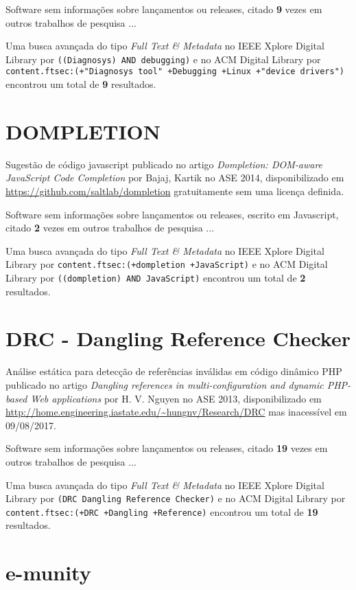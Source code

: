 Software sem informações sobre lançamentos ou releases,
citado {\bf 9} vezes em outros trabalhos de pesquisa ...

Uma busca avançada do tipo {\it Full Text \& Metadata} no IEEE Xplore Digital Library por
\texttt{((Diagnosys) AND debugging)}
e no ACM Digital Library por
\texttt{content.ftsec:(+"Diagnosys tool" +Debugging +Linux +"device drivers")}
encontrou um total de
{\bf 9}
resultados.

\section{DOMPLETION}

Sugestão de código javascript
publicado no artigo {\it Dompletion: DOM-aware JavaScript Code Completion}
por Bajaj, Kartik
no ASE 2014,
disponibilizado em \url{https://github.com/saltlab/dompletion}
gratuitamente
sem uma licença definida.

Software sem informações sobre lançamentos ou releases,
escrito em Javascript,
citado {\bf 2} vezes em outros trabalhos de pesquisa ...

Uma busca avançada do tipo {\it Full Text \& Metadata} no IEEE Xplore Digital Library por
\texttt{content.ftsec:(+dompletion +JavaScript)}
e no ACM Digital Library por
\texttt{((dompletion) AND JavaScript)}
encontrou um total de
{\bf 2}
resultados.

\section{DRC - Dangling Reference Checker}

Análise estática para detecção de referências inválidas em código dinâmico PHP
publicado no artigo {\it Dangling references in multi-configuration and dynamic PHP-based Web applications}
por H. V. Nguyen
no ASE 2013,
disponibilizado em \url{http://home.engineering.iastate.edu/~hungnv/Research/DRC}
mas inacessível em 09/08/2017.

Software sem informações sobre lançamentos ou releases,
citado {\bf 19} vezes em outros trabalhos de pesquisa ...

Uma busca avançada do tipo {\it Full Text \& Metadata} no IEEE Xplore Digital Library por
\texttt{(DRC Dangling Reference Checker)}
e no ACM Digital Library por
\texttt{content.ftsec:(+DRC +Dangling +Reference)}
encontrou um total de
{\bf 19}
resultados.

\section{e-munity}

